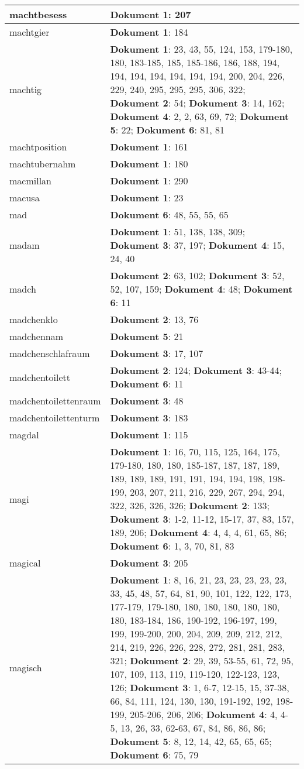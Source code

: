 \documentclass[a5paper]{article}
\begin{document}
\begin{longtable}[l]{|l|p{3in}|}
\hline
machtbesess & \textbf{Dokument 1}: 207 \\
\hline
machtgier & \textbf{Dokument 1}: 184 \\
\hline
machtig & \textbf{Dokument 1}: 23, 43, 55, 124, 153, 179-180, 180, 183-185, 185, 185-186, 186, 188, 194, 194, 194, 194, 194, 194, 194, 200, 204, 226, 229, 240, 295, 295, 295, 306, 322; \textbf{Dokument 2}: 54; \textbf{Dokument 3}: 14, 162; \textbf{Dokument 4}: 2, 2, 63, 69, 72; \textbf{Dokument 5}: 22; \textbf{Dokument 6}: 81, 81 \\
\hline
machtposition & \textbf{Dokument 1}: 161 \\
\hline
machtubernahm & \textbf{Dokument 1}: 180 \\
\hline
macmillan & \textbf{Dokument 1}: 290 \\
\hline
macusa & \textbf{Dokument 1}: 23 \\
\hline
mad & \textbf{Dokument 6}: 48, 55, 55, 65 \\
\hline
madam & \textbf{Dokument 1}: 51, 138, 138, 309; \textbf{Dokument 3}: 37, 197; \textbf{Dokument 4}: 15, 24, 40 \\
\hline
madch & \textbf{Dokument 2}: 63, 102; \textbf{Dokument 3}: 52, 52, 107, 159; \textbf{Dokument 4}: 48; \textbf{Dokument 6}: 11 \\
\hline
madchenklo & \textbf{Dokument 2}: 13, 76 \\
\hline
madchennam & \textbf{Dokument 5}: 21 \\
\hline
madchenschlafraum & \textbf{Dokument 3}: 17, 107 \\
\hline
madchentoilett & \textbf{Dokument 2}: 124; \textbf{Dokument 3}: 43-44; \textbf{Dokument 6}: 11 \\
\hline
madchentoilettenraum & \textbf{Dokument 3}: 48 \\
\hline
madchentoilettenturm & \textbf{Dokument 3}: 183 \\
\hline
magdal & \textbf{Dokument 1}: 115 \\
\hline
magi & \textbf{Dokument 1}: 16, 70, 115, 125, 164, 175, 179-180, 180, 180, 185-187, 187, 187, 189, 189, 189, 189, 191, 191, 194, 194, 198, 198-199, 203, 207, 211, 216, 229, 267, 294, 294, 322, 326, 326, 326; \textbf{Dokument 2}: 133; \textbf{Dokument 3}: 1-2, 11-12, 15-17, 37, 83, 157, 189, 206; \textbf{Dokument 4}: 4, 4, 4, 61, 65, 86; \textbf{Dokument 6}: 1, 3, 70, 81, 83 \\
\hline
magical & \textbf{Dokument 3}: 205 \\
\hline
magisch & \textbf{Dokument 1}: 8, 16, 21, 23, 23, 23, 23, 23, 33, 45, 48, 57, 64, 81, 90, 101, 122, 122, 173, 177-179, 179-180, 180, 180, 180, 180, 180, 180, 183-184, 186, 190-192, 196-197, 199, 199, 199-200, 200, 204, 209, 209, 212, 212, 214, 219, 226, 226, 228, 272, 281, 281, 283, 321; \textbf{Dokument 2}: 29, 39, 53-55, 61, 72, 95, 107, 109, 113, 119, 119-120, 122-123, 123, 126; \textbf{Dokument 3}: 1, 6-7, 12-15, 15, 37-38, 66, 84, 111, 124, 130, 130, 191-192, 192, 198-199, 205-206, 206, 206; \textbf{Dokument 4}: 4, 4-5, 13, 26, 33, 62-63, 67, 84, 86, 86, 86; \textbf{Dokument 5}: 8, 12, 14, 42, 65, 65, 65; \textbf{Dokument 6}: 75, 79 \\

\end{longtable}
\end{document}
